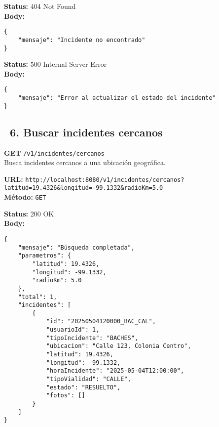\begin{tcolorbox}[response]
    \textbf{Status:} 404 Not Found\\
    \textbf{Body:}
    \begin{verbatim}
{
    "mensaje": "Incidente no encontrado"
}
    \end{verbatim}
\end{tcolorbox}

\begin{tcolorbox}[response]
    \textbf{Status:} 500 Internal Server Error\\
    \textbf{Body:}
    \begin{verbatim}
{
    "mensaje": "Error al actualizar el estado del incidente"
}
    \end{verbatim}
\end{tcolorbox}

\subsection*{\faServer\ 6. Buscar incidentes cercanos}
\begin{tcolorbox}[endpoint]
    \textbf{GET} \texttt{/v1/incidentes/cercanos}\\
    Busca incidentes cercanos a una ubicación geográfica.
\end{tcolorbox}

\begin{tcolorbox}[request]
    \textbf{URL:} \textcolor{urlColor}{\texttt{http://localhost:8080/v1/incidentes/cercanos?latitud=19.4326\&longitud=-99.1332\&radioKm=5.0}}\\
    \textbf{Método:} \textcolor{methodColor}{\texttt{GET}}
\end{tcolorbox}

\begin{tcolorbox}[response]
    \textbf{Status:} 200 OK\\
    \textbf{Body:}
    \begin{verbatim}
{
    "mensaje": "Búsqueda completada",
    "parametros": {
        "latitud": 19.4326,
        "longitud": -99.1332,
        "radioKm": 5.0
    },
    "total": 1,
    "incidentes": [
        {
            "id": "20250504120000_BAC_CAL",
            "usuarioId": 1,
            "tipoIncidente": "BACHES",
            "ubicacion": "Calle 123, Colonia Centro",
            "latitud": 19.4326,
            "longitud": -99.1332,
            "horaIncidente": "2025-05-04T12:00:00",
            "tipoVialidad": "CALLE",
            "estado": "RESUELTO",
            "fotos": []
        }
    ]
}
    \end{verbatim}
\end{tcolorbox}

